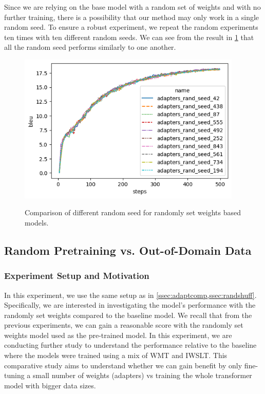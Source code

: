 Since we are relying on the base model with a random set of weights and with no further training, there is a possibility that our method may only work in a single random seed. To ensure a robust experiment, we repeat the random experiments ten times with ten different random seeds. We can see from the result in \cref{img:rndmseed} that all the random seed performs similarly to one another.

\begin{figure}[h]
    {\includegraphics[width=0.95\textwidth]{img/adapter_random_multiseed.png}}
    \centering
    \caption{Comparison of different random seed for randomly set weights based models.}
    \label{img:rndmseed}
\end{figure}

\subsection{Random Pretraining vs. Out-of-Domain Data}
\label{ssec:randpre}
\subsubsection{Experiment Setup and Motivation}
In this experiment, we use the same setup as in \cref{ssec:adaptcomp,ssec:randshuff}. Specifically, we are interested in investigating the model's performance with the randomly set weights compared to the baseline model. We recall that from the previous experiments, we can gain a reasonable score with the randomly set weights model used as the pre-trained model. In this experiment, we are conducting further study to understand the performance relative to the baseline where the models were trained using a mix of WMT and IWSLT. This comparative study aims to understand whether we can gain benefit by only fine-tuning a small number of weights (adapters) vs training the whole transformer model with bigger data sizes.

